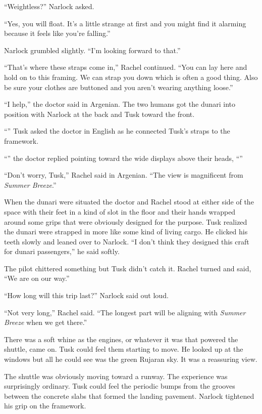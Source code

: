 ``Weightless?'' Narlock asked.

``Yes, you will float. It's a little strange at first and you might find it alarming because it
feels like you're falling.''

Narlock grumbled slightly. ``I'm looking forward to that.''

``That's where these straps come in,'' Rachel continued. ``You can lay here and hold on to this
framing. We can strap you down which is often a good thing. Also be sure your clothes are
buttoned and you aren't wearing anything loose.''

``I help,'' the doctor said in Argenian. The two humans got the dunari into position with
Narlock at the back and Tusk toward the front.

``'' Tusk asked the doctor in English as he connected
Tusk's straps to the framework.

``'' the doctor replied pointing toward the wide displays above
their heads, ``''

``Don't worry, Tusk,'' Rachel said in Argenian. ``The view is magnificent from \textit{Summer
  Breeze}.''

When the dunari were situated the doctor and Rachel stood at either side of the space with
their feet in a kind of slot in the floor and their hands wrapped around some grips that were
obviously designed for the purpose. Tusk realized the dunari were strapped in more like some
kind of living cargo. He clicked his teeth slowly and leaned over to Narlock. ``I don't think
they designed this craft for dunari passengers,'' he said softly.

The pilot chittered something but Tusk didn't catch it. Rachel turned and said, ``We are on our
way.''

``How long will this trip last?'' Narlock said out loud.

``Not very long,'' Rachel said. ``The longest part will be aligning with \textit{Summer Breeze}
when we get there.''

There was a soft whine as the engines, or whatever it was that powered the shuttle, came on.
Tusk could feel them starting to move. He looked up at the windows but all he could see was the
green Rujaran sky. It was a reassuring view.

The shuttle was obviously moving toward a runway. The experience was surprisingly ordinary. Tusk
could feel the periodic bumps from the grooves between the concrete slabs that formed the
landing pavement. Narlock tightened his grip on the framework.

